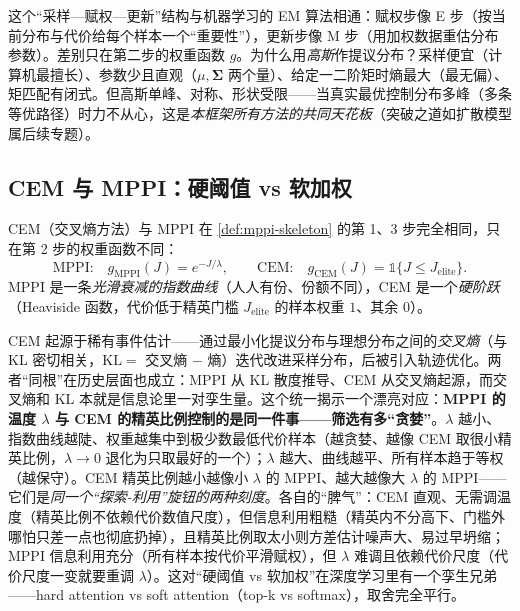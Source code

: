 \noindent 这个“采样—赋权—更新”结构与机器学习的 EM 算法相通：赋权步像 E 步（按当前分布与代价给每个样本一个“重要性”），更新步像 M 步（用加权数据重估分布参数）。差别只在第二步的权重函数 $g$。为什么用\emph{高斯}作提议分布？采样便宜（计算机最擅长）、参数少且直观（$\mu,\boldsymbol{\Sigma}$ 两个量）、给定一二阶矩时熵最大（最无偏）、矩匹配有闭式。但高斯单峰、对称、形状受限——当真实最优控制分布多峰（多条等优路径）时力不从心，这是\emph{本框架所有方法的共同天花板}（突破之道如扩散模型属后续专题）。

\subsection{CEM 与 MPPI：硬阈值 vs 软加权}
\label{sec:mppi-cem}

\begin{theorem}\label{thm:mppi-cem}
CEM（交叉熵方法）与 MPPI 在 \cref{def:mppi-skeleton} 的第 1、3 步完全相同，只在第 2 步的权重函数不同：
\begin{equation}
  \text{MPPI:}\quad g_{\mathrm{MPPI}}(J)=e^{-J/\lambda},\qquad
  \text{CEM:}\quad g_{\mathrm{CEM}}(J)=\mathbb{1}\{J\le J_{\mathrm{elite}}\}.
  \label{eq:mppi-cem-g}
\end{equation}
MPPI 是一条\emph{光滑衰减的指数曲线}（人人有份、份额不同），CEM 是一个\emph{硬阶跃}（Heaviside 函数，代价低于精英门槛 $J_{\mathrm{elite}}$ 的样本权重 $1$、其余 $0$）。
\end{theorem}

\noindent CEM\cite{rubinstein1999cross} 起源于稀有事件估计——通过最小化提议分布与理想分布之间的\emph{交叉熵}（与 KL 密切相关，$\mathrm{KL}=$ 交叉熵 $-$ 熵）迭代改进采样分布，后被引入轨迹优化。两者“同根”在历史层面也成立：MPPI 从 KL 散度推导、CEM 从交叉熵起源，而交叉熵和 KL 本就是信息论里一对孪生量。这个统一揭示一个漂亮对应：\textbf{MPPI 的温度 $\lambda$ 与 CEM 的精英比例控制的是同一件事——筛选有多“贪婪”}。$\lambda$ 越小、指数曲线越陡、权重越集中到极少数最低代价样本（越贪婪、越像 CEM 取很小精英比例，$\lambda\to0$ 退化为只取最好的一个）；$\lambda$ 越大、曲线越平、所有样本趋于等权（越保守）。CEM 精英比例越小越像小 $\lambda$ 的 MPPI、越大越像大 $\lambda$ 的 MPPI——它们是\emph{同一个“探索-利用”旋钮的两种刻度}。各自的“脾气”：CEM 直观、无需调温度（精英比例不依赖代价数值尺度），但信息利用粗糙（精英内不分高下、门槛外哪怕只差一点也彻底扔掉），且精英比例取太小则方差估计噪声大、易过早坍缩；MPPI 信息利用充分（所有样本按代价平滑赋权），但 $\lambda$ 难调且依赖代价尺度（代价尺度一变就要重调 $\lambda$）。这对“硬阈值 vs 软加权”在深度学习里有一个孪生兄弟——hard attention vs soft attention（top-k vs softmax），取舍完全平行。

